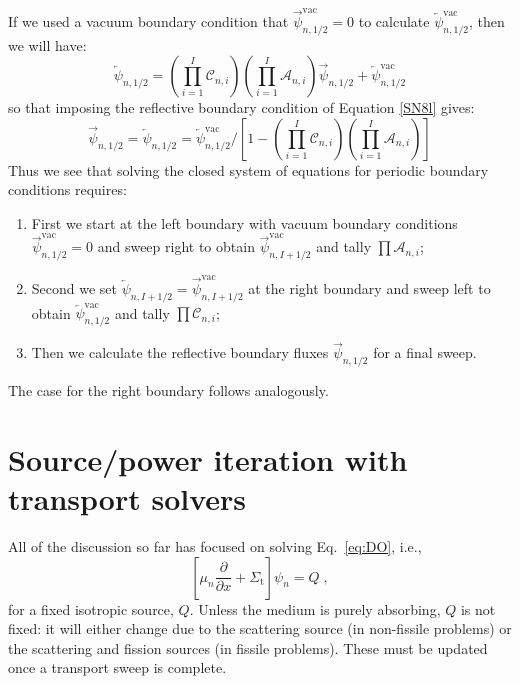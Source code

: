 \documentclass{article}
\begin{document}
If we used a vacuum boundary condition that $\overrightarrow{\psi}^\text{vac}_{n,1/2}=0$ to calculate $\overleftarrow{\psi}^\text{vac}_{n,1/2}$, then we will have:
\begin{equation}
    \overleftarrow{\psi}_{n,1/2}=\left(\prod_{i=1}^I\mathcal{C}_{n,i}\right)\left(\prod_{i=1}^I\mathcal{A}_{n,i}\right)\overrightarrow{\psi}_{n,1/2}+\overleftarrow{\psi}^\text{vac}_{n,1/2}
\end{equation}
so that imposing the reflective boundary condition of Equation \ref{SN8l} gives:
\begin{equation}
    \overrightarrow{\psi}_{n,1/2}=\overleftarrow{\psi}_{n,1/2}=\overleftarrow{\psi}^\text{vac}_{n,1/2}\bigg/\left[1-\left(\prod_{i=1}^I\mathcal{C}_{n,i}\right)\left(\prod_{i=1}^I\mathcal{A}_{n,i}\right)\right]
\end{equation}
Thus we see that solving the closed system of equations for periodic boundary conditions requires:
\begin{enumerate}
    \item First we start at the left boundary with vacuum boundary conditions $\overrightarrow{\psi}^\text{vac}_{n,1/2}=0$ and sweep right to obtain $\overrightarrow{\psi}^\text{vac}_{n,I+1/2}$ and tally $\prod\mathcal{A}_{n,i}$;
    \item Second we set $\overleftarrow{\psi}_{n,I+1/2}=\overrightarrow{\psi}^\text{vac}_{n,I+1/2}$ at the right boundary and sweep left to obtain $\overleftarrow{\psi}^\text{vac}_{n,1/2}$ and tally $\prod\mathcal{C}_{n,i}$;
    \item Then we calculate the reflective boundary fluxes $\overrightarrow{\psi}_{n,1/2}$ for a final sweep.
\end{enumerate}
The case for the right boundary follows analogously.

\section{Source/power iteration with transport solvers}

All of the discussion so far has focused on solving Eq.~\eqref{eq:DO}, i.e.,
\begin{equation*}
	 \left[\mu_n\frac{\partial}{\partial x} + \Sigma_\mathrm{t}\right]\psi_n
	= Q\;\mathrm{,}
\end{equation*}
for a fixed isotropic source, $Q$. Unless the medium is purely absorbing, $Q$ is not fixed: it will either change due to the scattering source (in non-fissile problems) or the scattering and fission sources (in fissile problems). These must be updated once a transport sweep is complete. 
\end{document}
